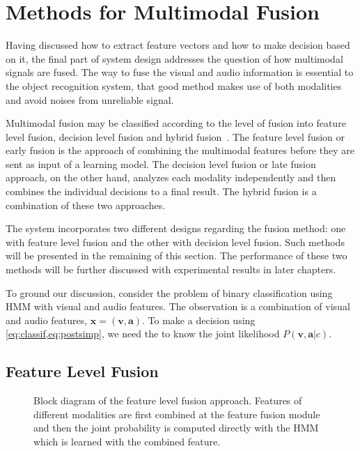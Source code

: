 \documentclass[12pt,final,twoside]{report}
\theoremstyle{plain}
\theoremstyle{definition}
\theoremstyle{remark}
\newcommand{\includetexfig}[1]{}
\begin{document}
\section{Methods for Multimodal Fusion}
Having discussed how to extract feature vectors and how to make decision based on it, the final part of system design addresses the question of how multimodal signals are fused. The way to fuse the visual and audio information is essential to the object recognition system, that good method makes use of both modalities and avoid noises from unreliable signal.

Multimodal fusion may be classified according to the level of fusion into feature level fusion, decision level fusion and hybrid fusion~\cite{atrey_multimodal_2010}. The feature level fusion or early fusion is the approach of combining the multimodal features before they are sent as input of a learning model. The decision level fusion or late fusion approach, on the other hand, analyzes each modality independently and then combines the individual decisions to a final result. The hybrid fusion is a combination of these two approaches.

The system incorporates two different designs regarding the fusion method: one with feature level fusion and the other with decision level fusion. Such methods will be presented in the remaining of this section. The performance of these two methods will be further discussed with experimental results in later chapters.

To ground our discussion, consider the problem of binary classification using HMM with visual and audio features. The observation is a combination of visual and audio features, $\mathbf{x} = (\mathbf{v}, \mathbf{a})$. To make a decision using \cref{eq:classif,eq:postsimp}, we need the to know the joint likelihood $P(\mathbf{v},\mathbf{a}|c)$.

\subsection{Feature Level Fusion}
\begin{figure}[t]
  \centering
  \includetexfig{featuref}
  \caption[Block diagram of the feature level fusion approach.]{Block diagram of the feature level fusion approach. Features of different modalities are first combined at the feature fusion module and then the joint probability is computed directly with the HMM which is learned with the combined feature.}
  \label{fig:featuref}
\end{figure}
\end{document}
